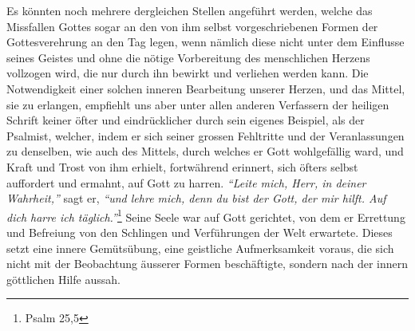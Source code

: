 Es könnten noch mehrere dergleichen Stellen
angeführt werden, welche das
Missfallen Gottes sogar an den von ihm selbst vorgeschriebenen Formen der
Gottesverehrung an den Tag legen, wenn nämlich diese nicht
unter dem Einflusse seines Geistes und ohne die nötige Vorbereitung des
menschlichen Herzens vollzogen wird, die nur durch ihn bewirkt und verliehen
werden kann. Die Notwendigkeit einer solchen inneren Bearbeitung unserer Herzen,
und das Mittel, sie zu erlangen, empfiehlt
uns aber unter allen anderen Verfassern der heiligen Schrift keiner öfter und
eindrücklicher durch sein eigenes Beispiel, als der
Psalmist, welcher, indem
er sich seiner grossen Fehltritte und der Veranlassungen zu denselben, wie auch
des Mittels, durch welches er Gott wohlgefällig ward, und Kraft und Trost von
ihm erhielt, fortwährend erinnert, sich öfters selbst auffordert und ermahnt,
auf Gott zu harren.
\textit{"`Leite mich, Herr, in deiner Wahrheit,"'}  sagt er,
\textit{"`und lehre mich, denn du bist der Gott, der mir hilft. Auf dich harre
ich täglich."'}\footnote{Psalm 25,5}
Seine Seele war auf Gott gerichtet, von dem er
Errettung und Befreiung von den Schlingen und Verführungen der Welt erwartete.
Dieses setzt eine innere Gemütsübung, eine geistliche Aufmerksamkeit voraus,
die sich nicht mit der Beobachtung äusserer Formen beschäftigte, sondern nach
der innern göttlichen Hilfe aussah.

\medskip

